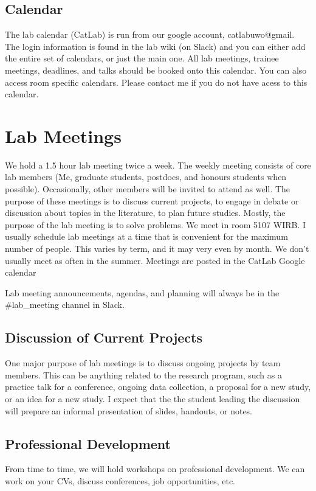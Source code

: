 \documentclass{article}
\begin{document}
\subsection{Calendar} 
The lab calendar (CatLab) is run from our google account, catlabuwo@gmail. The login information is found in the lab wiki (on Slack) and you can either add the entire set of calendars, or just the main one. All lab meetings, trainee meetings, deadlines, and talks should be booked onto this calendar. You can also access room specific calendars. Please contact me if you do not have acess to this calendar.




\section{Lab Meetings} \label{sec:Lab}
We hold a 1.5 hour lab meeting twice a week. The weekly meeting consists of core lab members (Me, graduate students, postdocs, and honours students when possible). Occasionally, other members will be invited to attend as well. The purpose of these meetings is to discuss current projects, to engage in debate or discussion about topics in the literature, to plan future studies. Mostly, the purpose of the lab meeting is to solve problems. We meet in room 5107 WIRB. I usually schedule lab meetings at a time that is convenient for the maximum number of people. This varies by term, and it may very even by month. We don't usually meet as often in the summer. Meetings are posted in the CatLab Google calendar

Lab meeting announcements, agendas, and planning will always be in the \#lab\_meeting channel in Slack. 

\subsection {Discussion of Current Projects}
One major purpose of lab meetings is to discuss ongoing projects by team members. This can be anything related to the research program, such as a practice talk for a conference, ongoing data collection, a proposal for a new study, or an idea for a new study. I expect that the the student leading the discussion will prepare an informal presentation of slides, handouts, or notes.

\subsection {Professional Development} 
From time to time, we will hold workshops on professional development. We can work on your CVs, discuss conferences, job opportunities, etc. 
\end{document}
